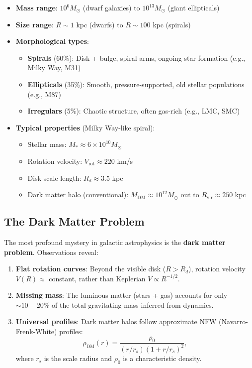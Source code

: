 \documentclass[12pt,a4paper]{article}
\theoremstyle{definition}
\theoremstyle{remark}
\begin{document}
\begin{itemize}[leftmargin=*]
\item \textbf{Mass range}: $10^6 M_\odot$ (dwarf galaxies) to $10^{13} M_\odot$ (giant ellipticals)
\item \textbf{Size range}: $R \sim 1$ kpc (dwarfs) to $R \sim 100$ kpc (spirals)
\item \textbf{Morphological types}:
  \begin{itemize}
  \item \textbf{Spirals} (60\%): Disk + bulge, spiral arms, ongoing star formation (e.g., Milky Way, M31)
  \item \textbf{Ellipticals} (35\%): Smooth, pressure-supported, old stellar populations (e.g., M87)
  \item \textbf{Irregulars} (5\%): Chaotic structure, often gas-rich (e.g., LMC, SMC)
  \end{itemize}
\item \textbf{Typical properties} (Milky Way-like spiral):
  \begin{itemize}
  \item Stellar mass: $M_* \approx 6 \times 10^{10} M_\odot$
  \item Rotation velocity: $V_{\text{rot}} \approx 220$ km/s
  \item Disk scale length: $R_d \approx 3.5$ kpc
  \item Dark matter halo (conventional): $M_{\text{DM}} \approx 10^{12} M_\odot$ out to $R_{\text{vir}} \approx 250$ kpc
  \end{itemize}
\end{itemize}

\subsection{The Dark Matter Problem}

The most profound mystery in galactic astrophysics is the \textbf{dark matter problem}. Observations reveal:

\begin{enumerate}
\item \textbf{Flat rotation curves}: Beyond the visible disk ($R > R_d$), rotation velocity $V(R) \approx$ constant, rather than Keplerian $V \propto R^{-1/2}$.
\item \textbf{Missing mass}: The luminous matter (stars + gas) accounts for only $\sim 10-20$\% of the total gravitating mass inferred from dynamics.
\item \textbf{Universal profiles}: Dark matter halos follow approximate NFW (Navarro-Frenk-White) profiles:
\begin{equation}
\rho_{\text{DM}}(r) = \frac{\rho_0}{(r/r_s)(1 + r/r_s)^2},
\end{equation}
where $r_s$ is the scale radius and $\rho_0$ is a characteristic density.
\end{enumerate}
\end{document}
